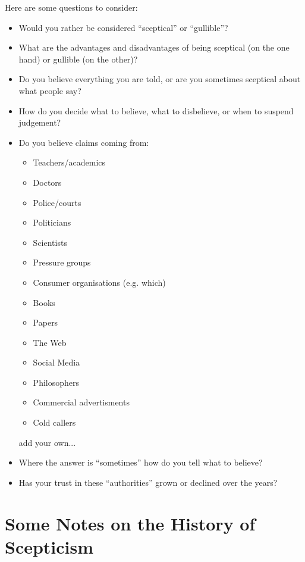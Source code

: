 \documentclass[14pt,titlepage]{extarticle}
\begin{document}
\pagebreak

Here are some questions to consider:

\begin{itemize}

\item Would you rather be considered ``sceptical'' or ``gullible''?

\item What are the advantages and disadvantages of being sceptical (on the one hand) or gullible (on the other)?

\item Do you believe everything you are told, or are you sometimes sceptical about what people say?

\item How do you decide what to believe, what to disbelieve, or when to suspend judgement?

\item Do you believe claims coming from:


\begin{itemize}
\item Teachers/academics
\item     Doctors
\item     Police/courts
\item     Politicians
\item     Scientists
\item     Pressure groups
\item     Consumer organisations (e.g. which)
\item     Books
\item     Papers
\item     The Web
\item     Social Media
\item     Philosophers
\item     Commercial advertisments
\item     Cold callers
\end{itemize}

add your own...

\item Where the answer is ``sometimes'' how do you tell what to believe?

\item Has your trust in these ``authorities'' grown or declined over the years?
\end{itemize}

\pagebreak

\section{Some Notes on the History of Scepticism}
\end{document}
